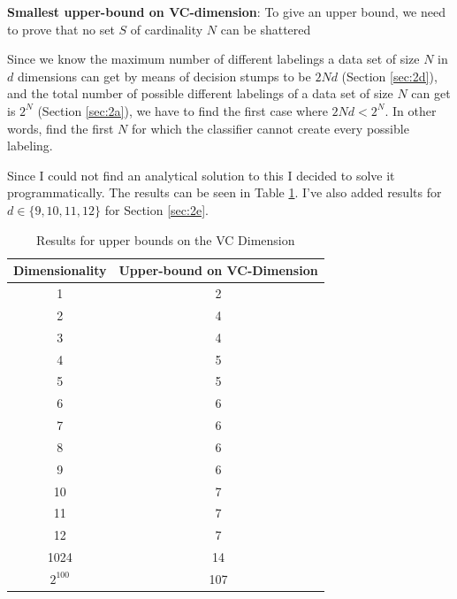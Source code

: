 \documentclass[11pt,a4paper]{article}
\begin{document}
\textbf{Smallest upper-bound on VC-dimension}: To give an upper bound, we need to prove that no set $S$ of cardinality $N$ can be shattered

Since we know the maximum number of different labelings a data set of size $N$ in $d$ dimensions can get by means of decision stumps to be $2Nd$ (Section \ref{sec:2d}), and the total number of possible different labelings of a data set of size $N$ can get is $2^N$ (Section \ref{sec:2a}), we have to find the first case where $2Nd < 2^N$. In other words, find the first $N$ for which the classifier cannot create every possible labeling.

Since I could not find an analytical solution to this I decided to solve it programmatically. The results can be seen in Table \ref{tab:upper-bound-vc}. I've also added results for $d \in \{9, 10, 11, 12\}$ for Section \ref{sec:2e}.

\begin{table}
    \begin{tabular}{|c|c|}
    \hline
    Dimensionality & Upper-bound on VC-Dimension \\ \hline
    1              & 2                            \\ \hline
    2              & 4                            \\ \hline
    3              & 4                            \\ \hline
    4              & 5                            \\ \hline
    5              & 5                            \\ \hline
    6              & 6                            \\ \hline
    7              & 6                           \\ \hline
    8              & 6                            \\ \hline

    9              & 6                            \\ \hline
    10              & 7                            \\ \hline
    11             & 7                            \\ \hline
    12              & 7                            \\ \hline

    
    1024           & 14                            \\ \hline
    $2^{100}$        & 107 \\
    \hline
    \end{tabular}
    \caption{Results for upper bounds on the VC Dimension}
    \label{tab:upper-bound-vc}
\end{table}
\end{document}
